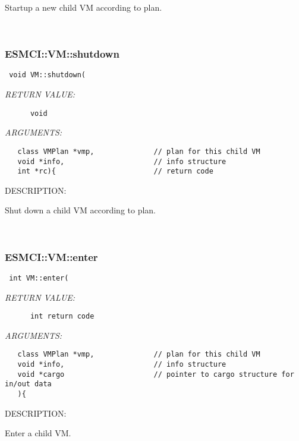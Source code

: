       Startup a new child VM according to plan.
   
 
\mbox{}\hrulefill\
 
\subsubsection [ESMCI::VM::shutdown] {ESMCI::VM::shutdown}


  
\begin{verbatim} void VM::shutdown(\end{verbatim}{\em RETURN VALUE:}
\begin{verbatim}      void\end{verbatim}{\em ARGUMENTS:}
\begin{verbatim}   class VMPlan *vmp,              // plan for this child VM
   void *info,                     // info structure
   int *rc){                       // return code\end{verbatim}
{\sf DESCRIPTION:\\ }


      Shut down a child VM according to plan.
   
 
\mbox{}\hrulefill\
 
\subsubsection [ESMCI::VM::enter] {ESMCI::VM::enter}


  
\begin{verbatim} int VM::enter(\end{verbatim}{\em RETURN VALUE:}
\begin{verbatim}      int return code\end{verbatim}{\em ARGUMENTS:}
\begin{verbatim}   class VMPlan *vmp,              // plan for this child VM
   void *info,                     // info structure
   void *cargo                     // pointer to cargo structure for in/out data
   ){\end{verbatim}
{\sf DESCRIPTION:\\ }


      Enter a child VM.
   
